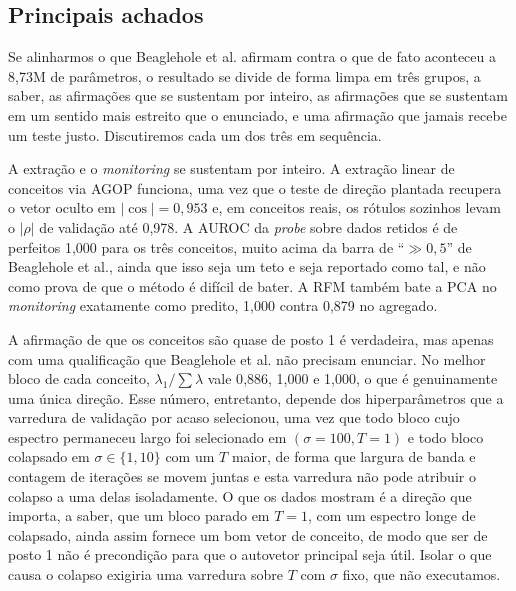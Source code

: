 \subsection{Principais achados}

Se alinharmos o que Beaglehole et al. afirmam contra o que de fato aconteceu a 8{,}73M de
parâmetros, o resultado se divide de forma limpa em três grupos, a saber, as afirmações que
se sustentam por inteiro, as afirmações que se sustentam em um sentido mais estreito que o
enunciado, e uma afirmação que jamais recebe um teste justo. Discutiremos cada um dos três
em sequência.

A extração e o \textit{monitoring} se sustentam por inteiro. A extração linear de conceitos via
AGOP funciona, uma vez que o teste de direção plantada recupera o vetor oculto em
$|\cos| = 0{,}953$ e, em conceitos reais, os rótulos sozinhos levam o $|\rho|$ de validação
até 0{,}978. A AUROC da \textit{probe} sobre dados retidos é de perfeitos 1{,}000 para os três
conceitos, muito acima da barra de ``$\gg 0{,}5$'' de Beaglehole et al., ainda que isso seja
um teto e seja reportado como tal, e não como prova de que o método é difícil de bater. A
RFM também bate a PCA no \textit{monitoring} exatamente como predito, 1{,}000 contra 0{,}879 no
agregado.

A afirmação de que os conceitos são quase de posto 1 é verdadeira, mas apenas com uma
qualificação que Beaglehole et al. não precisam enunciar. No melhor bloco de cada conceito,
$\lambda_1/\sum\lambda$ vale 0{,}886, 1{,}000 e 1{,}000, o que é genuinamente uma única direção.
Esse número, entretanto, depende dos hiperparâmetros que a varredura de validação por acaso
selecionou, uma vez que todo bloco cujo espectro permaneceu largo foi selecionado em
$(\sigma = 100, T = 1)$ e todo bloco colapsado em $\sigma \in \{1, 10\}$ com um $T$ maior,
de forma que largura de banda e contagem de iterações se movem juntas e esta varredura não
pode atribuir o colapso a uma delas isoladamente. O que os dados mostram é a direção que
importa, a saber, que um bloco parado em $T = 1$, com um espectro longe de colapsado, ainda
assim fornece um bom vetor de conceito, de modo que ser de posto 1 não é precondição para
que o autovetor principal seja útil. Isolar o que causa o colapso exigiria uma varredura
sobre $T$ com $\sigma$ fixo, que não executamos.

